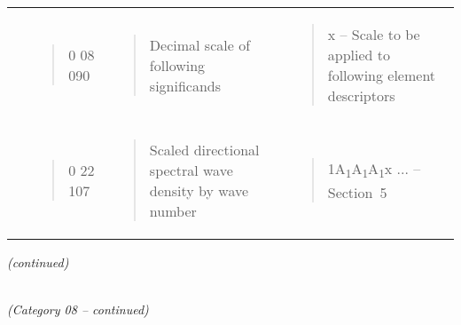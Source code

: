 \begin{longtable}[]{@{}llll@{}}
\begin{minipage}[t]{0.22\columnwidth}
\strut
\end{minipage} & \begin{minipage}[t]{0.22\columnwidth}\raggedright
\begin{quote}
0 08 090
\end{quote}\strut
\end{minipage} & \begin{minipage}[t]{0.22\columnwidth}\raggedright
\begin{quote}
Decimal scale of following significands
\end{quote}\strut
\end{minipage} & \begin{minipage}[t]{0.22\columnwidth}\raggedright
\begin{quote}
x -- Scale to be applied to following element descriptors
\end{quote}\strut
\end{minipage}\tabularnewline
\begin{minipage}[t]{0.22\columnwidth}\raggedright
\strut
\end{minipage} & \begin{minipage}[t]{0.22\columnwidth}\raggedright
\begin{quote}
0 22 107
\end{quote}\strut
\end{minipage} & \begin{minipage}[t]{0.22\columnwidth}\raggedright
\begin{quote}
Scaled directional spectral wave density by wave number
\end{quote}\strut
\end{minipage} & \begin{minipage}[t]{0.22\columnwidth}\raggedright
\begin{quote}
1A\textsubscript{1}A\textsubscript{1}A\textsubscript{1}x ... -- Section~5
\end{quote}\strut
\end{minipage}\tabularnewline
\bottomrule
\end{longtable}

\emph{(continued)}

\emph{\\
(Category 08 -- continued)}


